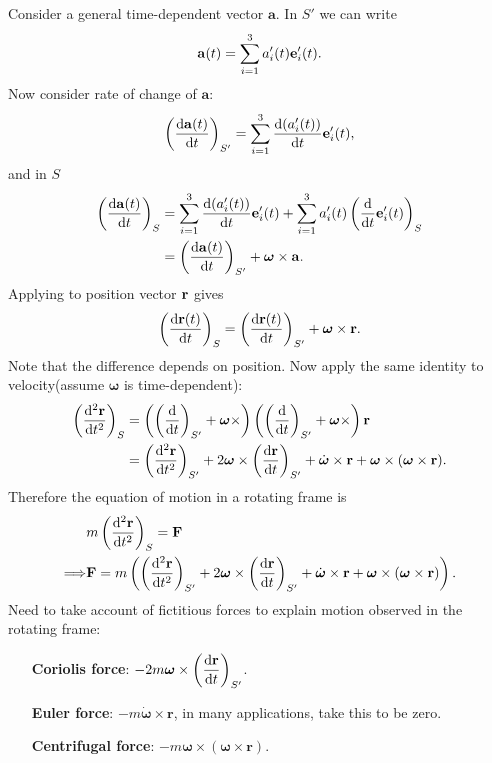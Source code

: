 Consider a general time-dependent vector $ \mathbf{a} $. In $ S' $ we can write
\[
    \mathbf{a}(t) = \sum_{i=1}^{3} a_i'(t){\bf e}_i'(t).
\]
Now consider rate of change of $ \mathbf{a} $:
\[
    \left( \frac{\mathrm{d}{\bf a}(t)}{\mathrm{d}t}  \right)_{S'} = \sum_{i=1}^{3}\frac{\mathrm{d}(a_i'(t))}{\mathrm{d}t}{\bf e}_i'(t) ,
\] 
and in $S$ 
\begin{align*}
    \left( \frac{\mathrm{d}{\bf a}(t)}{\mathrm{d}t} \right)_S 
    &= \sum_{i=1}^{3}\frac{\mathrm{d}(a_i'(t))}{\mathrm{d}t}{\bf e}_i'(t) + \sum_{i=1}^{3} a_i'(t) \left( \frac{\mathrm{d}}{\mathrm{d}t}{\bf e}_i'(t) \right)_S \\ 
    &= \left( \frac{\mathrm{d}{\bf a}(t)}{\mathrm{d}t}  \right)_{S'}+\boldsymbol{\omega} \times {\bf a}.
\end{align*}
Applying to position vector ${\bf r}$  gives
\[
    \left( \frac{\mathrm{d}{\bf r}(t)}{\mathrm{d}t} \right)_S=\left( \frac{\mathrm{d}{\bf r}(t)}{\mathrm{d}t}  \right)_{S'}+\boldsymbol{\omega}\times {\bf r}.
\]
Note that the difference depends on position. Now apply the same identity to velocity(assume $ \boldsymbol{\omega} $ is time-dependent):
\begin{align*}
    \left( \frac{\mathrm{d}^2{\bf r}}{\mathrm{d}t^2}  \right)_S &= \left( \left( \frac{\mathrm{d}}{\mathrm{d}t}  \right)_{S'}+\boldsymbol{\omega}\times  \right)\left( \left( \frac{\mathrm{d}}{\mathrm{d}t}  \right)_{S'}+\boldsymbol{\omega}\times  \right){\bf r}\\ 
    &=\left( \frac{\mathrm{d}^2{\bf r}}{\mathrm{d}t^2}  \right)_{S'}+2 \boldsymbol{\omega}\times \left( \frac{\mathrm{d}{\bf r}}{\mathrm{d}t}  \right)_{S'}+\dot{\boldsymbol{\omega}}\times \mathbf{r}+\boldsymbol{\omega} \times (\boldsymbol{\omega} \times \mathbf{r}).
\end{align*}
Therefore the equation of motion in a rotating frame is 
\begin{align*}
    &m \left( \frac{\mathrm{d}^2{\bf r}}{\mathrm{d}t^2}  \right)_S ={\bf F}\\ 
    \Longrightarrow &{\bf F}= m\left( \left( \frac{\mathrm{d}^2{\bf r}}{\mathrm{d}t^2}  \right)_{S'}+2 \boldsymbol{\omega}\times \left( \frac{\mathrm{d}{\bf r}}{\mathrm{d}t}  \right)_{S'}+\dot{\boldsymbol{\omega}}\times \mathbf{r}+\boldsymbol{\omega} \times (\boldsymbol{\omega} \times \mathbf{r}) \right).
\end{align*}
Need to take account of fictitious forces to explain motion observed in the rotating frame:
\begin{enumerate}[align=left]
    \item[\textbf{Coriolis force}:] $\displaystyle -2m\boldsymbol{\omega}\times \left( \frac{\mathrm{d}{\bf r}}{\mathrm{d}t}  \right)_{S'}$.
    \item[\textbf{Euler force}:] $\displaystyle -m\dot{\boldsymbol{\omega}}\times \mathbf{r}$, in many applications, take this to be zero.
    \item[\textbf{Centrifugal force}:] $\displaystyle -m\boldsymbol{\omega} \times (\boldsymbol{\omega} \times \mathbf{r})$.
\end{enumerate}

